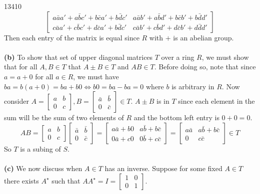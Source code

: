 \documentclass[11pt]{article}
\begin{document}
\begin{exercise}{134}{10}
{$$\begin{bmatrix}
            a \bar a a' + a \bar b c' + b \bar c a' + b \bar d c' & a \bar a b' + a \bar b d' + b \bar c b' + b \bar d d' \\
            c \bar a a' + c \bar b c' + d \bar c a' + b \bar d c' & c \bar a b' + c \bar b d' + d \bar c b' + d \bar d d'
        \end{bmatrix}
        $$
        Then each entry of the matrix is equal since $R$ with $+$ is an abelian group.
        \\\\
        {\bf (b)} To show that set of upper diagonal matrices $T$ over a ring $R$, we must show that for all $A,B \in T$ that $A \pm B \in T$ and $AB \in T$.
        Before doing so, note that since $a = a+0$ for all $a \in R$, we must have $ba = b(a + 0) = ba + b0 \iff b0 = ba - ba = 0$ where $b$ is arbitrary in $R$.
        Now consider $A = \begin{bmatrix} a & b \\ 0 & c \end{bmatrix}, B = \begin{bmatrix} \bar a & \bar b \\ 0 & \bar c \end{bmatrix} \in T$.
        $A \pm B$ is in $T$ since each element in the sum will be the sum of two elements of $R$ and the bottom left entry is $0+0=0$.
        $$ AB =
        \begin{bmatrix}
            a & b \\
            0 & c
        \end{bmatrix}
        \begin{bmatrix}
            \bar a & \bar b \\
            0 & \bar c
        \end{bmatrix}
        =
        \begin{bmatrix}
            a \bar a + b 0 & a \bar b + b \bar c \\
            0 \bar a + c 0 & 0 \bar b + c \bar c
        \end{bmatrix}
        =
        \begin{bmatrix}
            a \bar a & a \bar b + b \bar c \\
            0        & c \bar c
        \end{bmatrix}
        \in T
        $$
        So $T$ is a subing of $S$. \\\\
        {\bf (c)} We now discuss when $A \in T$ has an inverse.
        Suppose for some fixed $A \in T$ there exists $A^\star$ such that $A A^\star = I = \begin{bmatrix} 1 & 0 \\ 0 & 1 \end{bmatrix}$.
}
\end{exercise}
\end{document}
